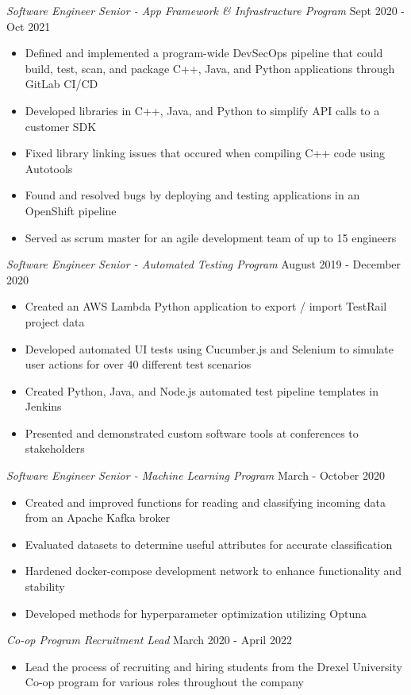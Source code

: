\documentclass[line,resmargin,11pt]{res}
\begin{document}
\begin{resume}
{\sl Software Engineer Senior - App Framework \& Infrastructure Program} \hfill Sept 2020 - Oct 2021
	\begin{itemize} \itemsep -2pt
		\item Defined and implemented a program-wide DevSecOps pipeline that could build, test, scan, and package C++, Java, and Python applications through GitLab CI/CD
		\item Developed libraries in C++, Java, and Python to simplify API calls to a customer SDK
		\item Fixed library linking issues that occured when compiling C++ code using Autotools
		\item Found and resolved bugs by deploying and testing applications in an OpenShift pipeline
		\item Served as scrum master for an agile development team of up to 15 engineers
	\end{itemize}

{\sl Software Engineer Senior - Automated Testing Program} \hfill August 2019 - December 2020
	\begin{itemize} \itemsep -2pt
		\item Created an AWS Lambda Python application to export / import TestRail project data
		\item Developed automated UI tests using Cucumber.js and Selenium to simulate user actions for over 40 different test scenarios
		\item Created Python, Java, and Node.js automated test pipeline templates in Jenkins
		\item Presented and demonstrated custom software tools at conferences to stakeholders
	\end{itemize}
	
{\sl Software Engineer Senior - Machine Learning Program} \hfill March - October 2020
	\begin{itemize} \itemsep -2pt
		\item Created and improved functions for reading and classifying incoming data from an Apache Kafka broker
		\item Evaluated datasets to determine useful attributes for accurate classification
		\item Hardened docker-compose development network to enhance functionality and stability
		\item Developed methods for hyperparameter optimization utilizing Optuna
	\end{itemize}
	
{\sl Co-op Program Recruitment Lead} \hfill March 2020 - April 2022
	\begin{itemize} \itemsep -2pt
		\item Lead the process of recruiting and hiring students from the Drexel University Co-op program for various roles throughout the company
	\end{itemize}


\end{resume}
\end{document}
